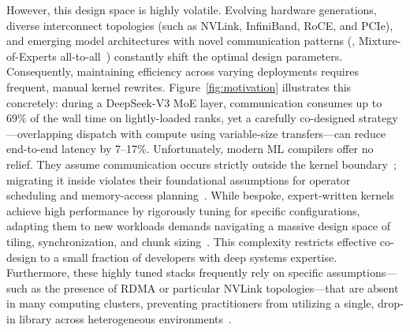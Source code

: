 However, this design space is highly volatile. Evolving hardware generations, diverse interconnect topologies (such as NVLink, InfiniBand, RoCE, and PCIe), and emerging model architectures with novel communication patterns (\eg, Mixture-of-Experts all-to-all~\cite{deepep2025}) constantly shift the optimal design parameters. Consequently, maintaining efficiency across varying deployments requires frequent, manual kernel rewrites. Figure~\ref{fig:motivation} illustrates this concretely: during a DeepSeek-V3 MoE layer, communication consumes up to 69\% of the wall time on lightly-loaded ranks, yet a carefully co-designed strategy—overlapping dispatch with compute using variable-size transfers—can reduce end-to-end latency by 7--17\%. Unfortunately, modern ML compilers offer no relief. They assume communication occurs strictly outside the kernel boundary~\cite{triton, xla, zheng2025tilelink}; migrating it inside violates their foundational assumptions for operator scheduling and memory-access planning~\cite{10.1109/SC41406.2024.00094}. While bespoke, expert-written kernels achieve high performance by rigorously tuning for specific configurations, adapting them to new workloads demands navigating a massive design space of tiling, synchronization, and chunk sizing~\cite{chang2024flux, zheng2025tilelink}. This complexity restricts effective co-design to a small fraction of developers with deep systems expertise. Furthermore, these highly tuned stacks frequently rely on specific assumptions—such as the presence of RDMA or particular NVLink topologies—that are absent in many computing clusters, preventing practitioners from utilizing a single, drop-in library across heterogeneous environments~\cite{deepep2025, licker2025rdmap2p}.


